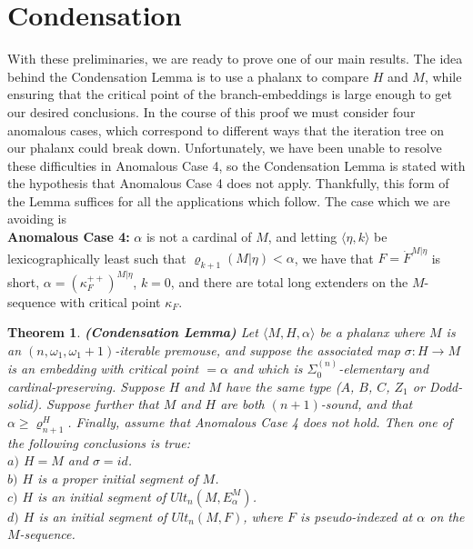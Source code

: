 \documentclass[12pt]{article}
\newtheorem{thm}{Theorem}[section]
\begin{document}
\section{Condensation}










With these preliminaries, we are ready to prove one of our main results.  The idea behind the Condensation Lemma is to use a phalanx to compare $H$ and $M$, while ensuring that the critical point of the branch-embeddings is large enough to get our desired conclusions.  In the course of this proof we must consider four anomalous cases, which correspond to different ways that the iteration tree on our phalanx could break down.  Unfortunately, we have been unable to resolve these difficulties in Anomalous Case 4, so the Condensation Lemma is stated with the hypothesis that Anomalous Case 4 does not apply.  Thankfully, this form of the Lemma suffices for all the applications which follow.  The case which we are avoiding is\\

\textbf{Anomalous Case 4:} $\alpha$ is not a cardinal of $M$, and letting $\langle \eta, k \rangle$ be lexicographically least such that $\varrho_{k+1} (M | \eta ) < \alpha$, we have that $F = \dot{F}^{M | \eta }$ is short, $\alpha = ( \kappa_F^{++} )^{M | \eta }$, $k = 0$, and there are total long extenders on the $M$-sequence with critical point $\kappa_F$.\\



\begin{thm} \textbf{(Condensation Lemma)}
Let $\langle M, H, \alpha \rangle$ be a phalanx where $M$ is an $(n , \omega_1 , \omega_1 +1 )$-iterable premouse, and suppose the associated map  $\sigma : H \longrightarrow M$ is an embedding with critical point $= \alpha$ and which is $\Sigma_0^{(n)}$-elementary and cardinal-preserving.  Suppose $H$ and $M$ have the same type ($A$, $B$, $C$, $Z_1$ or Dodd-solid).  Suppose further that $M$ and $H$ are both $(n+1)$-sound, and that $\alpha \geq \varrho_{n+1}^H$.  Finally, assume that Anomalous Case 4 does not hold.  Then one of the following conclusions is true:\\

\indent $a)$ $H = M$ and $\sigma = id$.\\

\indent $b)$ $H$ is a proper initial segment of $M$.\\

\indent $c)$ $H$ is an initial segment of $Ult_n (M, E_\alpha^M )$.\\

\indent $d)$ $H$ is an initial segment of $Ult_n (M, F)$, where $F$ is pseudo-indexed at $\alpha$ on the $M$-sequence.\\

\end{thm}
\end{document}
